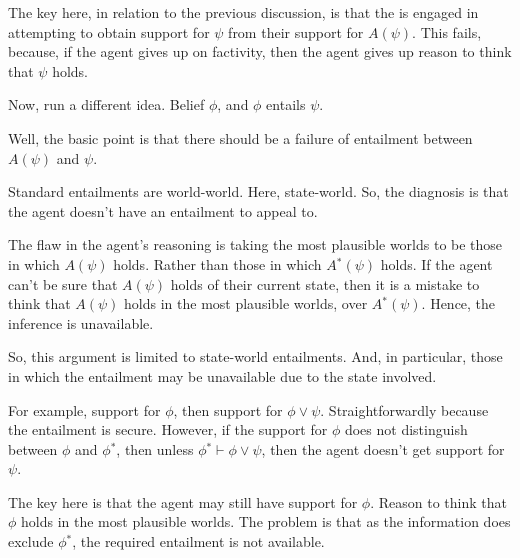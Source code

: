 \documentclass[10pt]{article}
\newcommand{\nf}[1]{#1\ensuremath{^{{*}}}}
\begin{document}
\begin{note}
  The key here, in relation to the previous discussion, is that the is engaged in attempting to obtain support for \(\psi\) from their support for \(A(\psi)\).
  This fails, because, if the agent gives up on factivity, then the agent gives up reason to think that \(\psi\) holds.

  Now, run a different idea.
  Belief \(\phi\), and \(\phi\) entails \(\psi\).

  Well, the basic point is that there should be a failure of entailment between \(A(\psi)\) and \(\psi\).

  Standard entailments are world-world.
  Here, state-world.
  So, the diagnosis is that the agent doesn't have an entailment to appeal to.

  The flaw in the agent's reasoning is taking the most plausible worlds to be those in which \(A(\psi)\) holds.
  Rather than those in which \(\nf{A}(\psi)\) holds.
  If the agent can't be sure that \(A(\psi)\) holds of their current state, then it is a mistake to think that \(A(\psi)\) holds in the most plausible worlds, over \(\nf{A}(\psi)\).
  Hence, the inference is unavailable.

  So, this argument is limited to state-world entailments.
  And, in particular, those in which the entailment may be unavailable due to the state involved.

  For example, support for \(\phi\), then support for \(\phi \lor \psi\).
  Straightforwardly because the entailment is secure.
  However, if the support for \(\phi\) does not distinguish between \(\phi\) and \(\nf{\phi}\), then unless \(\nf{\phi} \vdash \phi \lor \psi\), then the agent doesn't get support for \(\psi\).

  The key here is that the agent may still have support for \(\phi\).
  Reason to think that \(\phi\) holds in the most plausible worlds.
  The problem is that as the information does exclude \(\nf{\phi}\), the required entailment is not available.
\end{note}
\end{document}
